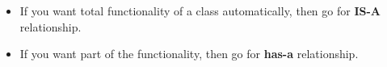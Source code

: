 \setlength{\columnsep}{3pt}
\begin{flushleft}
	\begin{itemize}
		\item If you want total functionality of a class automatically, then go for \textbf{IS-A} relationship.
		\item If you want part of the functionality, then go for \textbf{has-a} relationship.
	\end{itemize}
	
\end{flushleft}


\newpage
